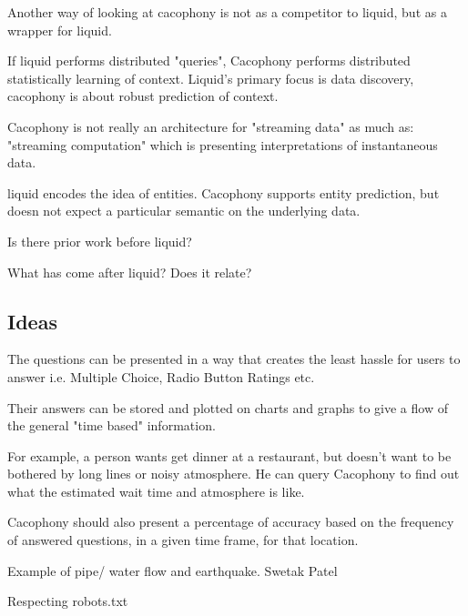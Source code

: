 Another way of looking at cacophony is not as a competitor to liquid, but as a
wrapper for liquid. 

If liquid performs distributed "queries", Cacophony performs distributed
statistically learning of context.  Liquid's primary focus is data discovery,
cacophony is about robust prediction of context.

Cacophony is not really an architecture for "streaming data" as much as:
"streaming computation" which is presenting interpretations of instantaneous
data.

liquid encodes the idea of entities.  Cacophony supports entity prediction, but
doesn not expect a particular semantic on the underlying data.



Is there prior work before liquid?

What has come after liquid?  Does it relate?
\cite{Hong2004}



\subsection{Ideas}

The questions can be presented in a way that creates the least hassle for users
to answer i.e. Multiple Choice, Radio Button Ratings etc.

Their answers can be
stored and plotted on charts and graphs to give a flow of the general "time
based" information. 

For
example, a person wants get dinner at a restaurant, but doesn't want to be
bothered by long lines or noisy atmosphere. He can query Cacophony to find out
what the estimated wait time and atmosphere is like. 

Cacophony should also
present a percentage of accuracy based on the frequency of answered questions,
in a given time frame, for that location.



Example of pipe/ water flow and earthquake.
Swetak Patel

Respecting robots.txt


